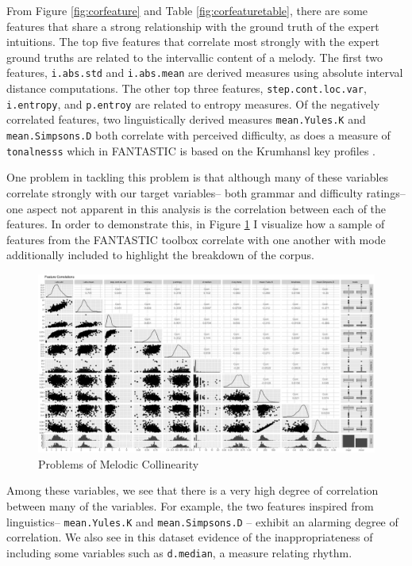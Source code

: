 \documentclass[12pt,]{book}
\begin{document}
From Figure \ref{fig:corfeature} and Table \ref{fig:corfeaturetable}, there are some features that share a strong relationship with the ground truth of the expert intuitions.
The top five features that correlate most strongly with the expert ground truths are related to the intervallic content of a melody.
The first two features, \texttt{i.abs.std} and \texttt{i.abs.mean} are derived measures using absolute interval distance computations.
The other top three features, \texttt{step.cont.loc.var}, \texttt{i.entropy}, and \texttt{p.entroy} are related to entropy measures.
Of the negatively correlated features, two linguistically derived measures \texttt{mean.Yules.K} and \texttt{mean.Simpsons.D} both correlate with perceived difficulty, as does a measure of \texttt{tonalnesss} which in FANTASTIC is based on the Krumhansl key profiles \citep{krumhanslCognitiveFoundationsMusical2001}.

One problem in tackling this problem is that although many of these variables correlate strongly with our target variables-- both grammar and difficulty ratings-- one aspect not apparent in this analysis is the correlation between each of the features.
In order to demonstrate this, in Figure \ref{fig:featurecorrelations} I visualize how a sample of features from the FANTASTIC toolbox correlate with one another with mode additionally included to highlight the breakdown of the corpus.

\begin{figure}

{\centering \includegraphics[width=1\linewidth]{img/FANTASTIC_collin} 

}

\caption{Problems of Melodic Collinearity}\label{fig:featurecorrelations}
\end{figure}

Among these variables, we see that there is a very high degree of correlation between many of the variables.
For example, the two features inspired from linguistics-- \texttt{mean.Yules.K} and \texttt{mean.Simpsons.D} -- exhibit an alarming degree of correlation.
We also see in this dataset evidence of the inappropriateness of including some variables such as \texttt{d.median}, a measure relating rhythm.
\end{document}
